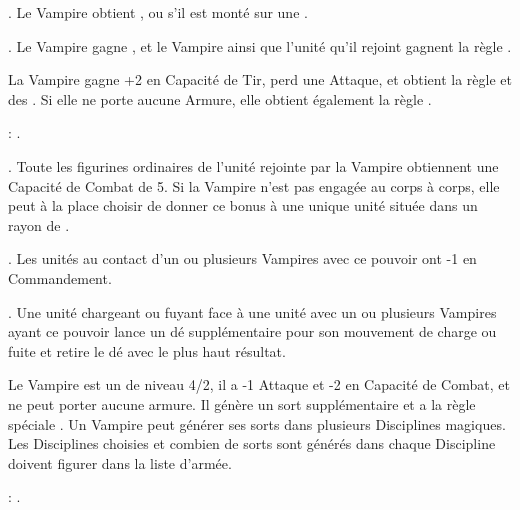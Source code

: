  \textbf{\bloodlinepower}. Le Vampire obtient , ou  s'il est monté sur une \largetarget{}.

 \textbf{\bloodlinepower}. Le Vampire gagne \awaken{\zombies, \direwolves, \batswarms, \greatbats}, et le Vampire ainsi que l'unité qu'il rejoint gagnent la règle \swiftstride{}.

\endpricelist

\separator

La Vampire gagne +2 en Capacité de Tir, perd une Attaque, et obtient la règle \lightningreflexes{} et des \throwingweapons{}. Si elle ne porte aucune Armure, elle obtient également la règle \distracting{}.

\bloodties{}: \courtofthedamned .

\startpricelist

 \textbf{\ancientbloodpower}. Toute les figurines ordinaires de l'unité rejointe par la Vampire obtiennent une Capacité de Combat de 5. Si la Vampire n'est pas engagée au corps à corps, elle peut à la place choisir de donner ce bonus à une unique unité située dans un rayon de .

 \textbf{\bloodlinepower}. Les unités au contact d'un ou plusieurs Vampires avec ce pouvoir ont -1 en Commandement.

 \textbf{\bloodlinepower}. Une unité chargeant ou fuyant face à une unité avec un ou plusieurs Vampires ayant ce pouvoir lance un dé supplémentaire pour son mouvement de charge ou fuite et retire le dé avec le plus haut résultat.

\endpricelist

\separator

Le Vampire est un \wizard{} de niveau 4/2, il a -1 Attaque et -2 en Capacité de Combat, et ne peut porter aucune armure. Il génère un sort supplémentaire et a la règle spéciale \awaken{\zombies, \skeletons}. Un Vampire \nosferatu{} peut générer ses sorts dans plusieurs Disciplines magiques. Les Disciplines choisies et combien de sorts sont générés dans chaque Discipline doivent figurer dans la liste d'armée.

\bloodties{}: \wraiths .

\startpricelist

